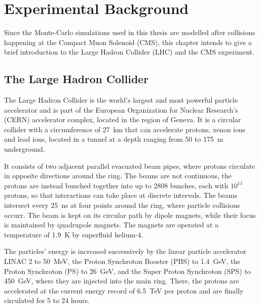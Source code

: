 \chapter{Experimental Background}
\label{ch:experiment}
Since the Monte-Carlo simulations used in this thesis are modelled after collisions happening at the Compact Muon Solenoid (CMS), this chapter intends to give a brief introduction to the Large Hadron Collider (LHC) and the CMS experiment.

\section{The Large Hadron Collider}
The Large Hadron Collider is the world's largest and most powerful particle accelerator and is part of the European Organization for Nuclear Research's (CERN) accelerator complex, located in the region of Geneva. It is a circular collider with a circumference of \SI{27}{km} that can accelerate protons, xenon ions and lead ions, located in a tunnel at a depth ranging from 50 to \SI{175}{m} underground.

It consists of two adjacent parallel evacuated beam pipes, where protons circulate in opposite directions around the ring. The beams are not continuous, the protons are instead bunched together into up to 2808 bunches, each with $10^{11}$ protons, so that interactions can take place at discrete intervals. The beams intersect every \SI{25}{ns} at four points around the ring, where particle collisions occurr. The beam is kept on its circular path by dipole magnets, while their focus is maintained by quadrupole magnets. The magnets are operated at a temperature of \SI{1.9}{K} by superfluid helium-4.

The particles' energy is increased successively by the linear particle accelerator LINAC 2 to \SI{50}{MeV}, the Proton Synchroton Booster (PBS) to \SI{1.4}{GeV}, the Proton Synchroton (PS) to \SI{26}{GeV}, and the Super Proton Synchroton (SPS) to \SI{450}{GeV}, where they are injected into the main ring. There, the protons are accelerated at the current energy record of \SI{6.5}{TeV} per proton and are finally circulated for 5 to 24 hours.

